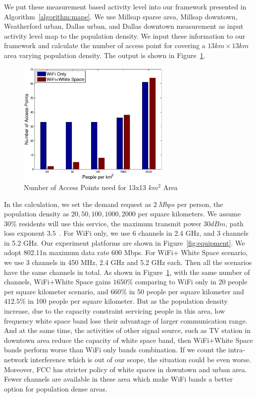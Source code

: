 We put these measurement based activity level into our framework presented in 
Algorithm~\ref{algorithm:mape}. We use Millsap
sparse area, Millsap downtown, Weatherford urban, Dallas urban, and Dallas downtown measurement as input activity level
map to the population density.
We input these information to our framework and calculate the number of access point for covering 
a $13 km \times 13 km$ area varying population density. The output is shown in Figure~\ref{fig:redensity}. 

   \begin{figure}
   \centering
   \includegraphics[width=74mm]{figures/redensity}
   \vspace{-0.1in}
   \caption{Number of Access Points need for 13x13 $km^2$ Area}
   \label{fig:redensity}
   \vspace{-0.1in}
   \end{figure}

In the calculation, we set the demand request as $2\ Mbps$ per person, the population
density as $20,50,100,1000,2000$ per square kilometers. We assume $30\%$ residents will use this
service, the maximum transmit power $30 dBm$, path loss exponent $3.5$~\cite{meikle2012global}. 
For WiFi only, we use 6 channels in 2.4 GHz, and 3 channels in 5.2 GHz. 
Our experiment platforms are shown in Figure~\ref{fig:equipment}.
We adopt 802.11n maximum data rate 600 Mbps. For WiFi+ White Space
scenario, we use 3 channels in 450 MHz, 2.4 GHz and 5.2 GHz each. Then all the scenarios have the 
same channels in total. As shown in Figure~\ref{fig:redensity},
with the same number of channels, WiFi+White Space gains $1650\%$ comparing to WiFi only in 20 people 
per square kilometer scenario, and $660\%$ in 50 people per square kilometer and $412.5\%$ in 100 people
per square kilometer. But as the population density increase, due to the capacity constraint servicing
people in this area, low frequency white space band lose their advantage of larger communication range. 
And at the same time, the activities of other signal source, such as TV station in downtown area reduce
the capacity of white space band, then WiFi+White Space bands perform worse than WiFi only bands combination.
If we count the intra-network interference which is out of our scope, the situation could be even worse.
Moreover, FCC has stricter policy of white spaces in downtown and urban area. Fewer channels
are available in these area which make WiFi bands a better option for population dense areas.

